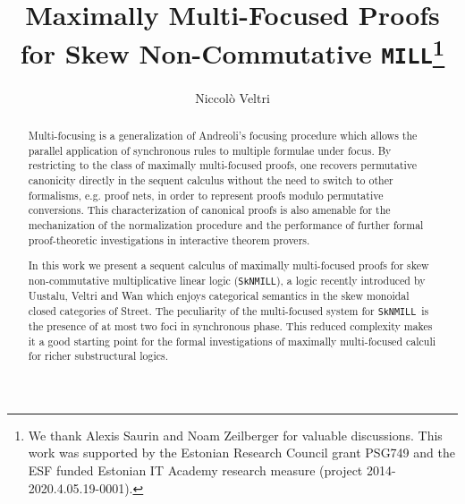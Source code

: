 \documentclass[runningheads]{llncs}
\newcommand{\MILL}{\texttt{MILL}}
\newcommand{\SkNMILL}{\texttt{SkNMILL}}
\begin{document}
\title{Maximally Multi-Focused Proofs for Skew Non-Commutative \MILL\thanks{We thank Alexis Saurin and Noam Zeilberger for valuable discussions. This work was supported by the Estonian Research Council grant PSG749 and the ESF funded Estonian IT Academy research measure (project 2014-2020.4.05.19-0001).}}

\author{Niccol{\`o} Veltri}
%
%
\maketitle
%
\begin{abstract}

  Multi-focusing is a generalization of Andreoli's focusing procedure which allows the parallel application of synchronous rules to multiple formulae under focus. By restricting to the class of maximally multi-focused proofs, one recovers permutative canonicity directly in the sequent calculus without the need to switch to other formalisms, e.g. proof nets, in order to  represent proofs modulo permutative conversions. This characterization of canonical proofs is also amenable for the mechanization of the normalization procedure and the performance of further formal proof-theoretic investigations in interactive theorem provers.

  In this work we present a sequent calculus of maximally multi-focused proofs for skew non-commutative multiplicative linear logic (\SkNMILL), a logic recently introduced by Uustalu, Veltri and Wan which enjoys categorical semantics in the skew monoidal closed categories of Street. The peculiarity of the multi-focused system for \SkNMILL\ is the presence of at most two foci in synchronous phase. This reduced complexity makes it a good starting point for the formal investigations of maximally multi-focused calculi for richer substructural logics.
  
\end{abstract}
\end{document}
